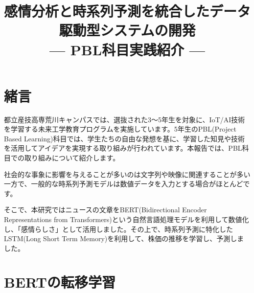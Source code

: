 \documentclass[a4paper,11pt]{article}
\title{{\TitleJFont\bfseries\fontsize{14pt}{14pt} 感情分析と時系列予測を統合したデータ駆動型システムの開発 \\ \normalsize --- PBL科目実践紹介 ---}}
\author{}
\date{}
\begin{document}
\setlength{\columnsep}{20pt}


\section{緒言}

都立産技高専荒川キャンパスでは、選抜された3～5年生を対象に、IoT/AI技術を学習する未来工学教育プログラムを実施しています。5年生のPBL(Project Based Learning)科目では、学生たちの自由な発想を基に、学習した知見や技術を活用してアイデアを実現する取り組みが行われています。本報告では、PBL科目での取り組みについて紹介します。

社会的な事象に影響を与えることが多いのは文字列や映像に関連することが多い一方で、一般的な時系列予測モデルは数値データを入力とする場合がほとんどです。

そこで、本研究ではニュースの文章をBERT(Bidirectional Encoder Representations from Transformers)という自然言語処理モデルを利用して数値化し、「感情らしさ」として活用しました。その上で、時系列予測に特化したLSTM(Long Short Term Memory)を利用して、株価の推移を学習し、予測しました。

\section{BERTの転移学習}
\end{document}

